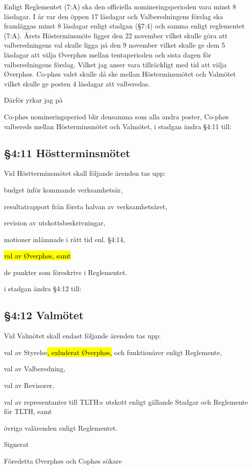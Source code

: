 \documentclass[../_main/handlingar.tex]{subfiles}
\begin{document}
Enligt Reglementet (7:A) ska den officiella nomineringsperioden vara minst 8 läsdagar. I år var den
öppen 17 läsdagar och Valberedningens förslag ska framläggas minst 8 läsdagar enligt stadgan (\S7:4)
och samma enligt reglementet (7:A). Årets Hösterminsmöte ligger den 22 november vilket skulle
göra att valberedningens val skulle ligga på den 9 november vilket skulle ge dem 5 läsdagar att välja
Øverphøs mellan tentaperioden och sista dagen för valberedningens förslag. Vilket jag anser vara
tillräckligt med tid att välja Øverphøs. Co-phøs valet skulle då ske mellan Hösterminsmötet och
Valmötet vilket skulle ge posten 4 läsdagar att valberedas.

Därför yrkar jag på
\begin{attsatser}
\att Co-phøs nomineringsperiod blir densamma som alla andra poster,
\att Co-phøs valbereds mellan Hösterminsmötet och Valmötet,
\newpage
\att i stadgan ändra \S4:11 till:
\subsection*{\S4:11 Höstterminsmötet}
Vid Höstterminsmötet skall följande ärenden tas upp:
\begin{alphlist}
    \item 	budget inför kommande verksamhetsår,
    \item 	resultatrapport från första halvan av verksamhetsåret,
    \item 	revision av utskottsbeskrivningar,
    \item 	motioner inlämnade i rätt tid enl. §4:14,
    \item   \hl{val av Øverphøs, samt}
    \item 	de punkter som föreskrivs i Reglementet.
\end{alphlist}
\att i stadgan ändra \S4:12 till:
\subsection*{\S4:12 Valmötet}
Vid Valmötet skall endast följande ärenden tas upp:
\begin{alphlist}
    \item val av Styrelse\hl{, exluderat Øverphøs,} och funktionärer enligt Reglemente,
    \item val av Valberedning,
    \item val av Revisorer,
    \item val av representanter till TLTH:s utskott enligt gällande Stadgar och
    Reglemente för TLTH, samt
    \item övriga valärenden enligt Reglementet.
\end{alphlist}
\changenote
\end{attsatser}
\begin{signatures}{1}
    Signerat
    \signature{Jonathan Benitez}{Föredetta Øverphøs och Cophøs sökare}
\end{signatures}
\end{document}
